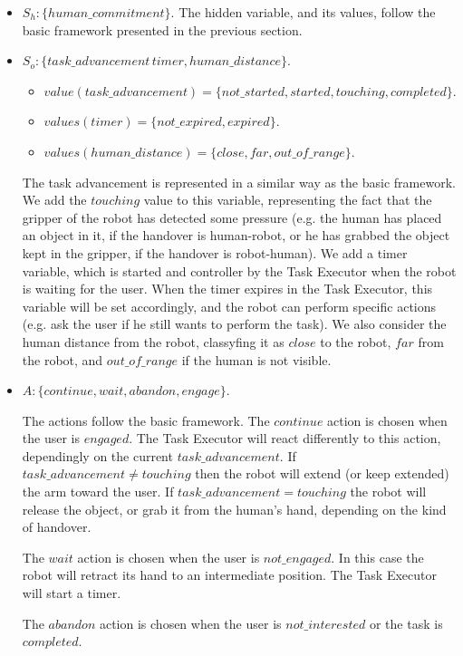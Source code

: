 \begin{itemize}
	\item $S_h:\{human\_commitment\}$.
		The hidden variable, and its values, follow the basic framework presented in the previous section.
	\item $S_o:\{task\_advancement\, timer, human\_distance\}$.
		\begin{itemize}
			\item $value(task\_advancement)=\{not\_started,started,touching,completed\}$.
			\item $values(timer)=\{not\_expired,expired\}$.
			\item $values(human\_distance)=\{close, far, out\_of\_range\}$.
		\end{itemize}

		The task advancement is represented in a similar way as the basic framework. We add the $touching$ value to this variable, representing the fact that the gripper of the robot has detected some pressure (e.g. the human has placed an object in it, if the handover is human-robot, or he has grabbed the object kept in the gripper, if the handover is robot-human).
		 We add a timer variable, which is started and controller by the Task Executor when the robot is waiting for the user. When the timer expires in the Task Executor, this variable will be set accordingly, and the robot can perform specific actions (e.g. ask the user if he still wants to perform the task).
		 We also consider the human distance from the robot, classyfing it as $close$ to the robot, $far$ from the robot, and $out\_of\_range$ if the human is not visible. 
	\item $A:\{continue,wait,abandon,engage\}$.

		The actions follow the basic framework. The $continue$ action is chosen when the user is $engaged$. The Task Executor will react differently to this action, dependingly on the current $task\_advancement$. If $task\_advancement \neq touching$ then the robot will extend (or keep extended) the arm toward the user. If $task\_advancement=touching$ the robot will release the object, or grab it from the human's hand, depending on the kind of handover.

		The $wait$ action is chosen when the user is $not\_engaged$. In this case the robot will retract its hand to an intermediate position. The Task Executor will start a timer.

		The $abandon$ action is chosen when the user is $not\_interested$ or the task is $completed$.


\end{itemize}
